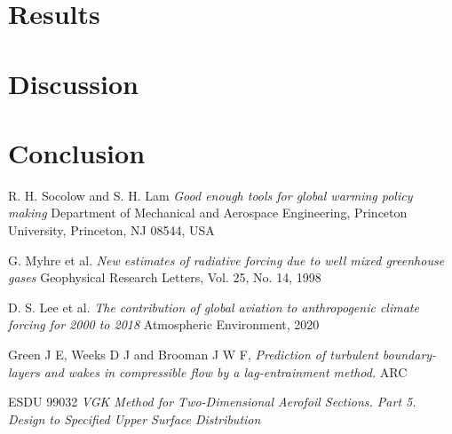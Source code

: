 \documentclass{article}
\begin{document}




\section{Results}

\section{Discussion}

\section{Conclusion}


\begin{thebibliography}{9}


    R. H. Socolow and S. H. Lam
    \emph{Good enough tools for global warming policy making}
    Department of Mechanical and Aerospace Engineering, Princeton University,
    Princeton, NJ 08544, USA

    G. Myhre et al.
    \emph{New estimates of radiative forcing due to well mixed greenhouse gases}
    Geophysical Research Letters, Vol. 25, No. 14, 1998

    D. S. Lee et al.
    \emph{The contribution of global aviation to anthropogenic climate forcing for 2000 to 2018}
    Atmospheric Environment, 2020

    Green J E, Weeks D J and Brooman J W F,
    \emph{Prediction of turbulent boundary-layers and wakes in compressible flow by a lag-entrainment method.}
    ARC

    ESDU 99032
    \emph{VGK Method for Two-Dimensional Aerofoil Sections. Part 5. Design to Specified Upper Surface Distribution}
  
\end{thebibliography}
\end{document}
